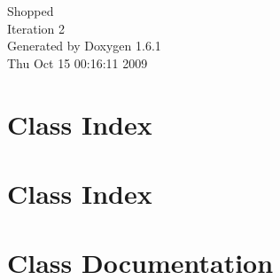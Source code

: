 \documentclass[a4paper]{book}
\begin{document}
\hypersetup{pageanchor=false}
\begin{titlepage}
\vspace*{7cm}
\begin{center}
{\Large Shopped \\[1ex]\large Iteration 2 }\\
\vspace*{1cm}
{\large Generated by Doxygen 1.6.1}\\
\vspace*{0.5cm}
{\small Thu Oct 15 00:16:11 2009}\\
\end{center}
\end{titlepage}
\clearemptydoublepage
{}
\tableofcontents
\clearemptydoublepage
{}
\hypersetup{pageanchor=true}
\chapter{Class Index}

\chapter{Class Index}

\chapter{Class Documentation}














\printindex
\end{document}
